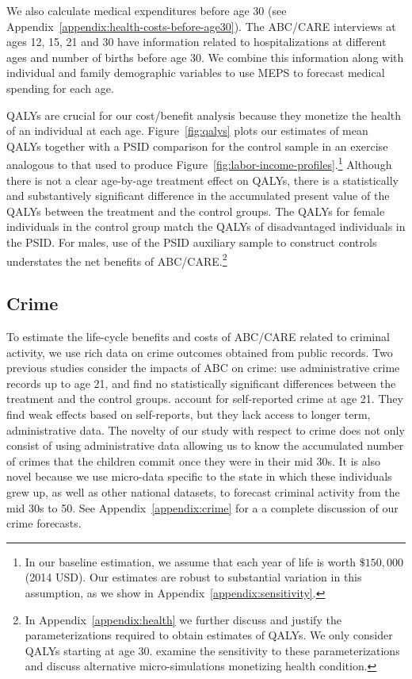 We also calculate medical expenditures before age 30 (see Appendix~\ref{appendix:health-costs-before-age30}). The ABC/CARE interviews at ages 12, 15, 21 and 30 have information related to hospitalizations at different ages and number of births before age 30. We combine this information along with individual and family demographic variables to use MEPS to forecast medical spending for each age.

QALYs are crucial for our cost/benefit analysis because they monetize the health of an individual at each age. Figure~\ref{fig:qalys} plots our estimates of mean QALYs together with a PSID comparison for the control sample in an exercise analogous to that used to produce Figure~\ref{fig:labor-income-profiles}.\footnote{In our baseline estimation, we assume that each year of life is worth  $\$150,000$ (2014 USD). Our estimates are robust to substantial variation in this assumption, as we show in  Appendix~\ref{appendix:sensitivity}.} Although there is not a clear age-by-age treatment effect on QALYs, there is a statistically and substantively significant difference in the accumulated present value of the QALYs between the treatment and the control groups. The QALYs for female individuals in the control group match the QALYs of disadvantaged individuals in the PSID. For males, use of the PSID auxiliary sample to construct controls understates the net benefits of ABC/CARE.\footnote{In  Appendix~\ref{appendix:health} we further discuss and justify the parameterizations required to obtain estimates of QALYs. We only consider QALYs starting at age 30. \citet{Goldman_etal_2015_Future-America-Model} examine the sensitivity to these parameterizations and discuss alternative micro-simulations monetizing health condition.}

\subsection{Crime}

To estimate the life-cycle benefits and costs of ABC/CARE related to criminal activity, we use rich data on crime outcomes obtained from public records. Two previous studies consider the impacts of ABC on crime: \citet{Clarke_Campbell_1998_ABC_Comparison_ECRQ} use administrative crime records up to age 21, and find no statistically significant differences between the treatment and the control groups. \cite{Barnett_Masse_2002_benefitcost,Barnett_Masse_2007_EER} account for self-reported crime at age 21. They find weak effects based on self-reports, but they lack access to longer term, administrative data. The novelty of our study with respect to crime does not only consist of using administrative data allowing us to know the accumulated number of crimes that the children commit once they were in their mid 30s. It is also novel because we use micro-data specific to the state in which these individuals grew up, as well as other national datasets, to forecast criminal activity from the mid 30s to 50. See Appendix~\ref{appendix:crime} for a a complete discussion of our crime forecasts.

